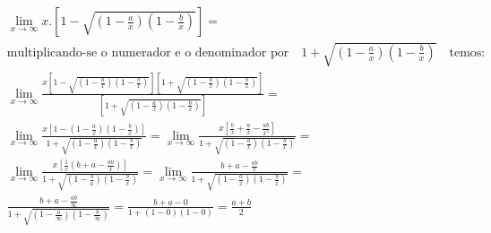 \begin{ex}
\begin{align}
&\lim_{x\rightarrow \infty} x.\left[1-\sqrt{(1-\frac{a}{x})(1-\frac{b}{x})}\right]=\nonumber\\
&\text{multiplicando-se o numerador e o denominador por}\quad 1+\sqrt{(1-\frac{a}{x})(1-\frac{b}{x})}\quad\text{temos:}\nonumber\\
&\lim_{x\rightarrow \infty}\frac{x[1-\sqrt{(1-\frac{a}{x})(1-\frac{b}{x})}][1+\sqrt{(1-\frac{a}{x})(1-\frac{b}{x})}]}{[1+\sqrt{(1-\frac{a}{x})(1-\frac{b}{x})}]}=\nonumber\\
&\lim_{x\rightarrow \infty} \frac{x[1-(1-\frac{a}{x})(1-\frac{b}{x})]}{1+\sqrt{(1-\frac{a}{x})(1-\frac{b}{x})}}=\lim_{x\rightarrow \infty} \frac{x[\frac{b}{x}+\frac{a}{x}-\frac{ab}{x^2}]}{1+\sqrt{(1-\frac{a}{x})(1-\frac{b}{x})}}=\nonumber\\
&\lim_{x\rightarrow \infty} \frac{x[\frac{1}{x}(b+a-\frac{ab}{x})]}{1+\sqrt{(1-\frac{b}{a})(1-\frac{b}{x})}}=\lim_{x\rightarrow \infty} \frac{b+a-\frac{ab}{x}}{1+\sqrt{(1-\frac{a}{x})(1-\frac{b}{x})}}=\nonumber\\
&\frac{b+a-\frac{ab}{\infty}}{1+\sqrt{(1-\frac{a}{\infty})(1-\frac{b}{\infty})}}=\frac{b+a-0}{1+(1-0)(1-0)}=\frac{a+b}{2}\nonumber
\end{align}
\end{ex}